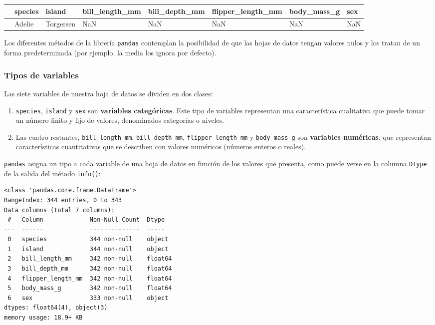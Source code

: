 \documentclass[
  a4paper,
  noprof,
  12pt,
  notoc,
  nosols,
  nobib]{mnye}
\theoremstyle{definition}
\theoremstyle{remark}
\begin{document}
\begin{longtable}[]{@{}llllllll@{}}
\toprule\noalign{}
& species & island & bill\_length\_mm & bill\_depth\_mm &
flipper\_length\_mm & body\_mass\_g & sex \\
\midrule\noalign{}
\endhead
\bottomrule\noalign{}
\endlastfoot
3 & Adelie & Torgersen & NaN & NaN & NaN & NaN & NaN \\
\end{longtable}

Los diferentes métodos de la librería \texttt{pandas} contemplan la
posibilidad de que las hojas de datos tengan valores nulos y los tratan
de un forma predeterminada (por ejemplo, la media los ignora por
defecto).

\subsubsection{Tipos de variables}\label{tipos-de-variables}

Las siete variables de nuestra hoja de datos se dividen en dos clases:

\begin{enumerate}
\def\labelenumi{\arabic{enumi}.}
\item
  \texttt{species}, \texttt{island} y \texttt{sex} son \textbf{variables
  categóricas}. Este tipo de variables representan una característica
  cualitativa que puede tomar un número finito y fijo de valores,
  denominados categorías o niveles.
\item
  Las cuatro restantes, \texttt{bill\_length\_mm},
  \texttt{bill\_depth\_mm}, \texttt{flipper\_length\_mm} y
  \texttt{body\_mass\_g} son \textbf{variables numéricas}, que
  representan características cuantitativas que se describen con valores
  numéricos (números enteros o reales).
\end{enumerate}

\texttt{pandas} asigna un tipo a cada variable de una hoja de datos en
función de los valores que presenta, como puede verse en la columna
\texttt{Dtype} de la salida del método \texttt{info()}:

\begin{verbatim}
<class 'pandas.core.frame.DataFrame'>
RangeIndex: 344 entries, 0 to 343
Data columns (total 7 columns):
 #   Column             Non-Null Count  Dtype  
---  ------             --------------  -----  
 0   species            344 non-null    object 
 1   island             344 non-null    object 
 2   bill_length_mm     342 non-null    float64
 3   bill_depth_mm      342 non-null    float64
 4   flipper_length_mm  342 non-null    float64
 5   body_mass_g        342 non-null    float64
 6   sex                333 non-null    object 
dtypes: float64(4), object(3)
memory usage: 18.9+ KB
\end{verbatim}
\end{document}
